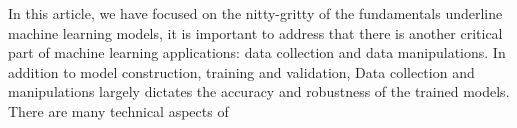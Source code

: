 In this article, we have focused on the nitty-gritty of the fundamentals underline machine learning models, it is important to address that there is another critical part of machine learning applications: data collection and data manipulations. In addition to model construction, training and validation, Data collection and manipulations largely dictates the accuracy and robustness of the trained models. There are many technical aspects of 